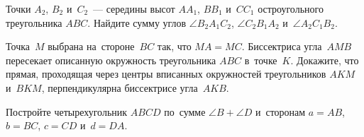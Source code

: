 \begin{problems}
\item
Точки $A_2$, $B_2$ и~$C_2$~--- середины высот $A A_1$, $B B_1$ и~$C C_1$
остроугольного треугольника $ABC$.
Найдите сумму углов
$\angle B_2 A_1 C_2$, $\angle C_2 B_1 A_2$ и~$\angle A_2 C_1 B_2$.

\item
Точка~$M$ выбрана на~стороне~$BC$ так, что $MA = MC$.
Биссектриса угла~$AMB$ пересекает описанную окружность треугольника $ABC$
в~точке~$K$.
Докажите, что прямая, проходящая через центры вписанных окружностей
треугольников $AKM$ и~$BKM$, перпендикулярна биссектрисе угла~$AKB$.

\item
Постройте четырехугольник $ABCD$ по~сумме $\angle B + \angle D$ и~сторонам
$a = AB$, $b = BC$, $c = CD$ и~$d = DA$.

\end{problems}

\endgroup %

